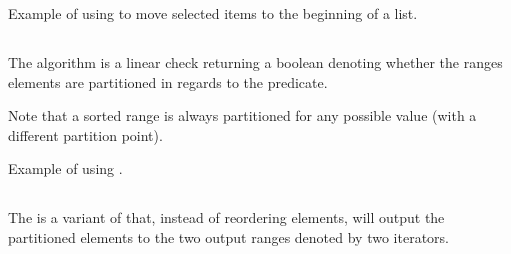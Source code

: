 

\begin{codebox}[]{\href{https://compiler-explorer.com/z/zjeczYqK8}{\ExternalLink}}
\footnotesize Example of using  to move selected items to the beginning of a list.
\tcblower
{}
\end{codebox}

\subsection{\texorpdfstring{}{\texttt{std::is\_partitioned}}}

The  algorithm is a linear check returning a boolean denoting whether the ranges elements are partitioned in regards to the predicate.


Note that a sorted range is always partitioned for any possible value (with a different partition point).

\begin{codebox}[]{\href{https://compiler-explorer.com/z/nKecEhs3b}{\ExternalLink}}
\footnotesize Example of using .
\tcblower
{}
\end{codebox}

\subsection{\texorpdfstring{}{\texttt{std::partition\_copy}}}

The  is a variant of  that, instead of reordering elements, will output the partitioned elements to the two output ranges denoted by two iterators.


